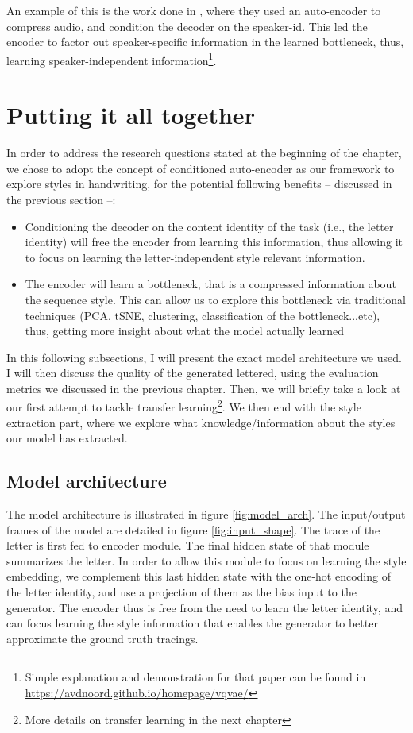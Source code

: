     \par An example of this is the work done in \citep{van2017neural}, where they used an auto-encoder to compress audio, and condition the decoder on the speaker-id. This led the encoder to factor out speaker-specific information in the learned bottleneck, thus, learning speaker-independent information\footnote{Simple explanation and demonstration for that paper can be found in \url{https://avdnoord.github.io/homepage/vqvae/}}.

\section{Putting it all together}
  \par In order to address the research questions stated at the beginning of the chapter, we chose to adopt the concept of conditioned auto-encoder as our framework to explore styles in handwriting, for the potential following benefits -- discussed in the previous section --:
  \begin{itemize}
    \item Conditioning the decoder on the content identity of the task (i.e., the letter identity) will free the encoder from learning this information, thus allowing it to focus on learning the letter-independent style relevant information.
    \item The encoder will learn a bottleneck, that is a compressed information about the sequence style. This can allow us to explore this bottleneck via traditional techniques (PCA, tSNE, clustering, classification of the bottleneck...etc), thus, getting more insight about what the model actually learned
  \end{itemize}

  \par In this following subsections, I will present the exact model architecture we used. I will then discuss the quality of the generated lettered, using the evaluation metrics we discussed in the previous chapter. Then, we will briefly take a look at our first attempt to tackle transfer learning\footnote{More details on transfer learning in the next chapter}. We then end with the style extraction part, where we explore what knowledge/information about the styles our model has extracted.

  \subsection{Model architecture}
     \par The model architecture is illustrated in figure \ref{fig:model_arch}. The input/output frames of the model are detailed in figure \ref{fig:input_shape}. The trace of the letter is first fed to encoder module. The final hidden state of that module summarizes the letter. In order to allow this module to focus on learning the style embedding, we complement this last hidden state with the one-hot encoding of the letter identity, and use a projection of them as the bias input to the generator. The encoder thus is free from the need to learn the letter identity, and can focus learning the style information that enables the generator to better approximate the ground truth tracings.

